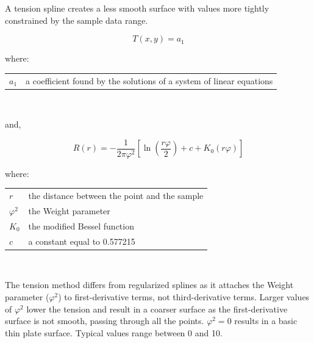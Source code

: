 \documentclass{article}
\makeatletter
\newenvironment{conditions}[1][where:] 
  {#1 \begin{tabular}[t]{>{$}l<{$} @{${}={}$} l}}
  {\end{tabular}\\[\belowdisplayskip]}
\makeatother
\begin{document}
A tension spline creates a less smooth surface with values more tightly constrained by the sample data range.

\[T(x, y) = a_{1} \]

\begin{conditions}
    a_{1} & a coefficient found by the solutions of a system of linear equations
\end{conditions}

and, 

\[R(r) = - \frac{1}{2 \pi \varphi^2} \left[\ln\left(\frac{r \varphi}{2}\right) + c + K_0 \left(r \varphi\right)\right]\]

\begin{conditions}
    r & the distance between the point and the sample \\
    \varphi^2 & the Weight parameter \\
    K_0 & the modified Bessel function \\
    c & a constant equal to 0.577215
\end{conditions}

The tension method differs from regularized splines as it attaches the Weight parameter ($\varphi^2$) to first-derivative terms, not third-derivative terms.
Larger values of $\varphi^2$  lower the tension and result in a coarser surface as the first-derivative surface is not smooth, passing through all the points.
$\varphi^2 = 0$ results in a basic thin plate surface.
Typical values range between 0 and 10.
\end{document}
